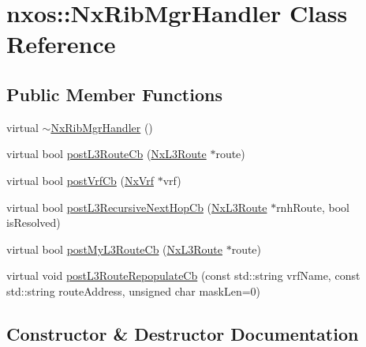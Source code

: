 \hypertarget{classnxos_1_1_nx_rib_mgr_handler}{}\section{nxos\+:\+:Nx\+Rib\+Mgr\+Handler Class Reference}
\label{classnxos_1_1_nx_rib_mgr_handler}
\subsection*{Public Member Functions}
\begin{DoxyCompactItemize}
\item 
virtual \mbox{\hyperlink{classnxos_1_1_nx_rib_mgr_handler_a0b2d07d8f5547b196f6eda3d77f9ca97}{$\sim$\+Nx\+Rib\+Mgr\+Handler}} ()
\item 
virtual bool \mbox{\hyperlink{classnxos_1_1_nx_rib_mgr_handler_a1b742d50365fdece0ea47eb38300f7de}{post\+L3\+Route\+Cb}} (\mbox{\hyperlink{classnxos_1_1_nx_l3_route}{Nx\+L3\+Route}} $\ast$route)
\item 
virtual bool \mbox{\hyperlink{classnxos_1_1_nx_rib_mgr_handler_a2ed5a3ad9c0e55d21e18d88a19419a5e}{post\+Vrf\+Cb}} (\mbox{\hyperlink{classnxos_1_1_nx_vrf}{Nx\+Vrf}} $\ast$vrf)
\item 
virtual bool \mbox{\hyperlink{classnxos_1_1_nx_rib_mgr_handler_ae11a0ef873528002f86cd41a5871ad65}{post\+L3\+Recursive\+Next\+Hop\+Cb}} (\mbox{\hyperlink{classnxos_1_1_nx_l3_route}{Nx\+L3\+Route}} $\ast$rnh\+Route, bool is\+Resolved)
\item 
virtual bool \mbox{\hyperlink{classnxos_1_1_nx_rib_mgr_handler_af4214a821d17a84b4746b0dd94b5d58b}{post\+My\+L3\+Route\+Cb}} (\mbox{\hyperlink{classnxos_1_1_nx_l3_route}{Nx\+L3\+Route}} $\ast$route)
\item 
virtual void \mbox{\hyperlink{classnxos_1_1_nx_rib_mgr_handler_ac3b189923604f553505b0741b8acd39d}{post\+L3\+Route\+Repopulate\+Cb}} (const std\+::string vrf\+Name, const std\+::string route\+Address, unsigned char mask\+Len=0)
\end{DoxyCompactItemize}


\subsection{Constructor \& Destructor Documentation}
\mbox{\label{classnxos_1_1_nx_rib_mgr_handler_a0b2d07d8f5547b196f6eda3d77f9ca97}} 
